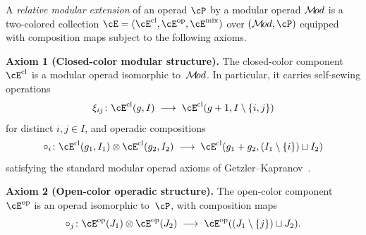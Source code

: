 \begin{definition}
\label{def:relative-modular-extension}
A \emph{relative modular extension} of an operad $\cP$ by a
modular operad $\mathcal{M}\!od$ is a two-colored collection
$\cE = (\cE^{\mathrm{cl}}, \cE^{\mathrm{op}},
\cE^{\mathrm{mix}})$ over $(\cM\!od, \cP)$ equipped with
composition maps subject to the following axioms.

\smallskip\noindent
\textbf{Axiom 1 (Closed-color modular structure).}
The closed-color component $\cE^{\mathrm{cl}}$ is a modular
operad isomorphic to~$\mathcal{M}\!od$. In particular, it carries
self-sewing operations
\[
\xi_{ij} \colon
\cE^{\mathrm{cl}}(g, I)
\;\longrightarrow\;
\cE^{\mathrm{cl}}(g+1, I \setminus \{i,j\})
\]
for distinct $i,j \in I$, and operadic compositions
\[
\circ_i \colon
\cE^{\mathrm{cl}}(g_1, I_1)
\otimes \cE^{\mathrm{cl}}(g_2, I_2)
\;\longrightarrow\;
\cE^{\mathrm{cl}}(g_1 + g_2, (I_1 \setminus \{i\})
\sqcup I_2)
\]
satisfying the standard modular operad axioms of
Getzler--Kapranov~\cite{GK98}.

\smallskip\noindent
\textbf{Axiom 2 (Open-color operadic structure).}
The open-color component $\cE^{\mathrm{op}}$ is an operad
isomorphic to~$\cP$, with composition maps
\[
\circ_j \colon
\cE^{\mathrm{op}}(J_1)
\otimes \cE^{\mathrm{op}}(J_2)
\;\longrightarrow\;
\cE^{\mathrm{op}}((J_1 \setminus \{j\}) \sqcup J_2).
\]


\end{definition}
